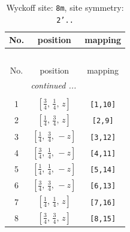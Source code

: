 \documentclass[fleqn,8pt]{jsarticle}
\begin{document}
\begin{longtable}{ccc}
\caption{Wyckoff site: {\tt 8m}, site symmetry: {\tt 2'..}}
 \\
 \hline \hline
No. & position & mapping \\ \hline \endfirsthead

\multicolumn{2}{l}{\tablename\ \thetable{}} \\
 \hline \hline
No. & position & mapping \\ \hline \endhead

 \hline \hline
\multicolumn{2}{r}{\footnotesize\it continued ...} \\ \endfoot

 \hline \hline
\multicolumn{2}{r}{} \\ \endlastfoot

1 & $\left[ \frac{3}{4},\, \frac{1}{4},\, z \right]$ & {\tt [1,10]} \\ \hline
2 & $\left[ \frac{1}{4},\, \frac{3}{4},\, z \right]$ & {\tt [2,9]} \\ \hline
3 & $\left[ \frac{1}{4},\, \frac{3}{4},\, - z \right]$ & {\tt [3,12]} \\ \hline
4 & $\left[ \frac{3}{4},\, \frac{1}{4},\, - z \right]$ & {\tt [4,11]} \\ \hline
5 & $\left[ \frac{1}{4},\, \frac{1}{4},\, - z \right]$ & {\tt [5,14]} \\ \hline
6 & $\left[ \frac{3}{4},\, \frac{3}{4},\, - z \right]$ & {\tt [6,13]} \\ \hline
7 & $\left[ \frac{1}{4},\, \frac{1}{4},\, z \right]$ & {\tt [7,16]} \\ \hline
8 & $\left[ \frac{3}{4},\, \frac{3}{4},\, z \right]$ & {\tt [8,15]} \\
\end{longtable}
\renewcommand{\arraystretch}{1.2}
\end{document}
